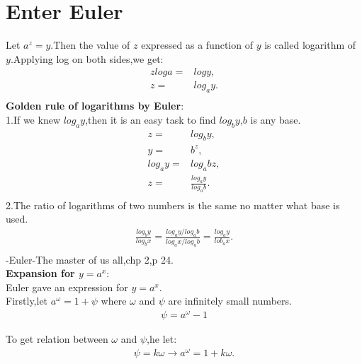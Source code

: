 \documentclass[a4paper,reqno,11pt]{book}
\theoremstyle{plain}%
\theoremstyle{definition}
\begin{document}
\section{Enter Euler}
\noindent Let $a^z=y$.Then the value of $z$ expressed as a function of $y$ is called logarithm of $y$.Applying log on both sides,we get:
\begin{align*}
zloga=&logy,\\
z=&log_{a}{y}.\\
\end{align*}
\noindent\textbf{Golden rule of logarithms by Euler}:\cite{ref3}\\
1.If we knew $log_{a}{y}$,then it is an easy task to find $log_{b}{y}$,$b$ is any base.\\
\begin{align*}
z=&log_{b}{y},\\
y=&b^z,\\
log_{a}{y}=&log_{a}{b}z,\\
z=&\frac{log_{a}{y}}{log_{a}{b}}.\\
\end{align*}
\noindent2.The ratio of logarithms of two numbers is the same no matter what base is used.
\begin{eqnarray*}
\frac{log_{b}{y}}{log_{b}{x}}=\frac{log_{a}{y}/log_{a}{b}}{log_{a}{x}/log_{a}{b}}=\frac{log_{a}{y}}{lob_{a}{x}}.\\
\end{eqnarray*}
\vspace{2ex}
\hfill {-Euler-The master of us all,chp 2,p 24.}
\\
\noindent\textbf{Expansion for $y=a^x$}:\\
Euler gave an expression for $y=a^x$.\\
Firstly,let $a^\omega=1+\psi$ where $\omega$ and $\psi$ are infinitely small numbers.
\begin{eqnarray*}
    \psi=a^\omega-1
\end{eqnarray*}

\noindent To get relation between $\omega$ and $\psi$,he let:
\begin{eqnarray*}
    \psi=k\omega\longrightarrow a^\omega=1+k\omega.
\end{eqnarray*}
\end{document}
